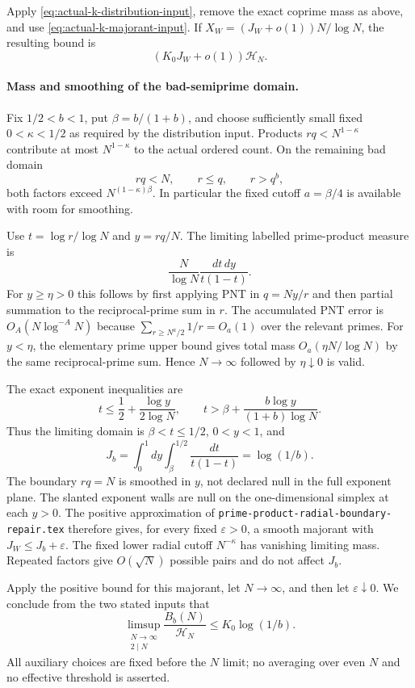 Apply \eqref{eq:actual-k-distribution-input}, remove the exact coprime
mass as above, and use \eqref{eq:actual-k-majorant-input}. If
$X_W=(J_W+o(1))N/\log N$, the resulting bound is
\[
 (K_0J_W+o(1))\mathcal H_N.
\]

\paragraph{Mass and smoothing of the bad-semiprime domain.}
Fix $1/2<b<1$, put $\beta=b/(1+b)$, and choose sufficiently small
fixed $0<\kappa<1/2$ as required by the distribution input.
Products $rq<N^{1-\kappa}$ contribute at most $N^{1-\kappa}$ to
the actual ordered count. On the remaining bad domain
\[
 rq<N,\qquad r\le q,\qquad r>q^b,
\]
both factors exceed $N^{(1-\kappa)\beta}$. In particular the fixed
cutoff $a=\beta/4$ is available with room for smoothing.

Use $t=\log r/\log N$ and $y=rq/N$. The limiting labelled
prime-product measure is
\[
 \frac{N}{\log N}\frac{dt\,dy}{t(1-t)}.
\]
For $y\ge\eta>0$ this follows by first applying PNT in
$q=Ny/r$ and then partial summation to the reciprocal-prime sum in
$r$. The accumulated PNT error is $O_A(N\log^{-A}N)$ because
$\sum_{r\ge N^a/2}1/r=O_a(1)$ over the relevant primes.
For $y<\eta$, the elementary prime upper bound gives total mass
$O_a(\eta N/\log N)$ by the same reciprocal-prime sum.
Hence $N\to\infty$ followed by $\eta\downarrow0$ is valid.

The exact exponent inequalities are
\[
 t\le\frac12+\frac{\log y}{2\log N},\qquad
 t>\beta+\frac{b\log y}{(1+b)\log N}.
\]
Thus the limiting domain is $\beta<t\le1/2$, $0<y<1$, and
\[
 J_b=\int_0^1\!dy\int_\beta^{1/2}\frac{dt}{t(1-t)}
     =\log(1/b).
\]
The boundary $rq=N$ is smoothed in $y$, not declared null in the
full exponent plane. The slanted exponent walls are null on the
one-dimensional simplex at each $y>0$. The positive approximation
of \texttt{prime-product-radial-boundary-repair.tex} therefore gives,
for every fixed $\varepsilon>0$, a smooth majorant with
$J_W\le J_b+\varepsilon$. The fixed lower radial cutoff
$N^{-\kappa}$ has vanishing limiting mass. Repeated factors give
$O(\sqrt N)$ possible pairs and do not affect $J_b$.

Apply the positive bound for this majorant, let $N\to\infty$, and
then let $\varepsilon\downarrow0$. We conclude from the two stated
inputs that
\begin{equation}\label{eq:actual-k-bad-count-conclusion}
 \limsup_{\substack{N\to\infty\\2\mid N}}
 \frac{B_b(N)}{\mathcal H_N}\le K_0\log(1/b).
\end{equation}
All auxiliary choices are fixed before the $N$ limit; no averaging
over even $N$ and no effective threshold is asserted.

